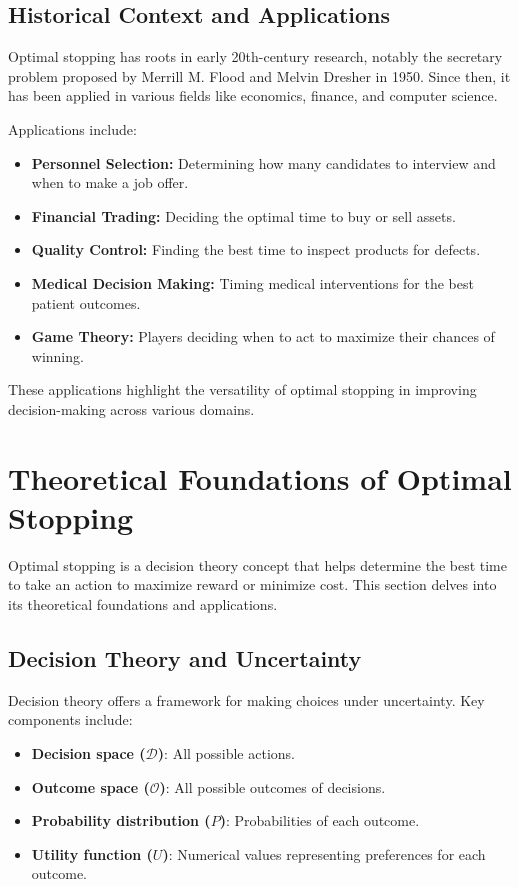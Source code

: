 \documentclass[12pt]{book} %
\begin{document}
\subsection{Historical Context and Applications}

Optimal stopping has roots in early 20th-century research, notably the secretary problem proposed by Merrill M. Flood and Melvin Dresher in 1950. Since then, it has been applied in various fields like economics, finance, and computer science.

Applications include:

\begin{itemize}
    \item \textbf{Personnel Selection:} Determining how many candidates to interview and when to make a job offer.
    \item \textbf{Financial Trading:} Deciding the optimal time to buy or sell assets.
    \item \textbf{Quality Control:} Finding the best time to inspect products for defects.
    \item \textbf{Medical Decision Making:} Timing medical interventions for the best patient outcomes.
    \item \textbf{Game Theory:} Players deciding when to act to maximize their chances of winning.
\end{itemize}

These applications highlight the versatility of optimal stopping in improving decision-making across various domains.


\section{Theoretical Foundations of Optimal Stopping}

Optimal stopping is a decision theory concept that helps determine the best time to take an action to maximize reward or minimize cost. This section delves into its theoretical foundations and applications.

\subsection{Decision Theory and Uncertainty}

Decision theory offers a framework for making choices under uncertainty. Key components include:

\begin{itemize}
    \item \textbf{Decision space ($\mathcal{D}$)}: All possible actions.
    \item \textbf{Outcome space ($\mathcal{O}$)}: All possible outcomes of decisions.
    \item \textbf{Probability distribution ($P$)}: Probabilities of each outcome.
    \item \textbf{Utility function ($U$)}: Numerical values representing preferences for each outcome.
\end{itemize}
\end{document}
